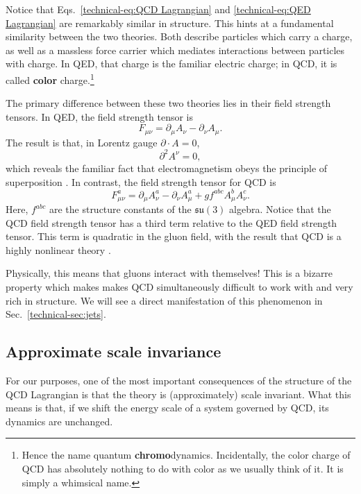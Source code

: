 \documentclass[../thesis.tex]{subfiles}
\providecommand{\su}{\mathfrak{su}}
\begin{document}
	Notice that Eqs.~\ref{technical-eq:QCD Lagrangian} and \ref{technical-eq:QED Lagrangian} are remarkably similar in structure. This hints at a fundamental similarity between the two theories. Both describe particles which carry a charge, as well as a massless force carrier which mediates interactions between particles with charge. In QED, that charge is the familiar electric charge; in QCD, it is called \textbf{color} charge.\footnote{Hence the name quantum \textbf{chromo}dynamics. Incidentally, the color charge of QCD has absolutely nothing to do with color as we usually think of it. It is simply a whimsical name.}

	The primary difference between these two theories lies in their field strength tensors. In QED, the field strength tensor is \cite{larkoski_elementary_2019-1}
	\begin{equation}
		F_{\mu \nu} = \partial_\mu A_\nu - \partial_\nu A_\mu.
	\end{equation}
	The result is that, in Lorentz gauge $\partial \cdot A = 0$,
	\begin{equation}
		\partial^2 A^\nu = 0,
	\end{equation}
	which reveals the familiar fact that electromagnetism obeys the principle of superposition \cite{larkoski_elementary_2019-1}. In contrast, the field strength tensor for QCD is \cite{larkoski_elementary_2019-1}
	\begin{equation}\label{technical-eq:QCD field strength}
		F_{\mu \nu}^a = \partial_\mu A_\nu^a - \partial_\nu A_\mu^a + g f^{abc} A_\mu^b A_\nu^c.
	\end{equation}
	Here, $f^{abc}$ are the structure constants of the $\su(3)$ algebra. Notice that the QCD field strength tensor has a third term relative to the QED field strength tensor. This term is quadratic in the gluon field, with the result that QCD is a highly nonlinear theory \cite{larkoski_elementary_2019-1}. 

	Physically, this means that gluons interact with themselves! This is a bizarre property which makes makes QCD simultaneously difficult to work with and very rich in structure. We will see a direct manifestation of this phenomenon in Sec.~\ref{technical-sec:jets}.

\subsection{Approximate scale invariance}
	For our purposes, one of the most important consequences of the structure of the QCD Lagrangian is that the theory is (approximately) scale invariant. What this means is that, if we shift the energy scale of a system governed by QCD, its dynamics are unchanged. 
\end{document}
